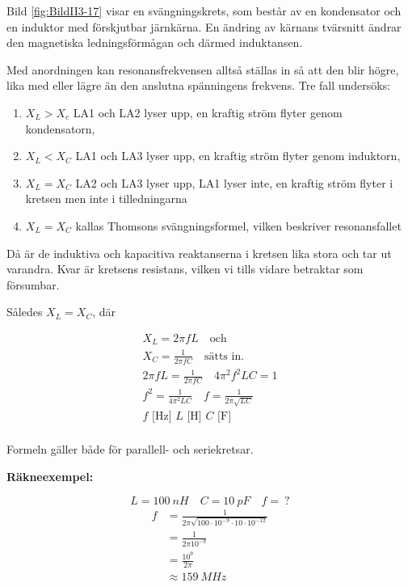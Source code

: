 Bild \ref{fig:BildII3-17} visar en svängningskrets, som består av en
kondensator och en induktor med förskjutbar järnkärna.
En ändring av kärnans tvärsnitt ändrar den magnetiska ledningsförmågan och
därmed induktansen.

Med anordningen kan resonansfrekvensen alltså ställas in så att den blir högre,
lika med eller lägre än den anslutna spänningens frekvens.
Tre fall undersöks:
\begin{enumerate}
\item \(X_L > X_c\) LA1 och LA2 lyser upp, en kraftig ström flyter genom
  kondensatorn,
\item \(X_L < X_C\) LA1 och LA3 lyser upp, en kraftig ström flyter genom
  induktorn,
\item \(X_L= X_C\) LA2 och LA3 lyser upp, LA1 lyser inte, en kraftig ström
  flyter i kretsen men inte i tilledningarna
\item \(X_L = X_C\) kallas Thomsons svängningsformel, vilken beskriver
  resonansfallet
\end{enumerate}

Då är de induktiva och kapacitiva reaktanserna i kretsen lika stora och tar ut
varandra.
Kvar är kretsens resistans, vilken vi tills vidare betraktar som försumbar.

Således \(X_L = X_C\), där

\begin{gather*}
  X_L = 2\pi fL \quad \text{och} \\
  X_C = \frac{1}{2\pi fC} \quad \text{sätts in.} \\
  2\pi fL = \frac{1}{2\pi fC} \quad 4\pi ^2f^2LC = 1 \\
  f^2 = \frac{1}{4\pi ^2LC} \quad f = \frac{1}{2\pi \sqrt{LC}} \\
  f\text{ [Hz] }L\text{ [H] }C\text{ [F] } \\
\end{gather*}

Formeln gäller både för parallell- och seriekretsar.

\textbf{Räkneexempel:}

\[L = 100\ nH \quad C = 10\ pF \quad f =\ ?\]
\begin{align*}
  f &= \frac{1}{2\pi \sqrt{100 \cdot 10^{-9} \cdot 10 \cdot 10^{-12}}} \\
  &= \frac{1}{2\pi 10^{-9}} \\
  &= \frac{10^9}{2\pi } \\
  &\approx 159\ MHz
\end{align*}

